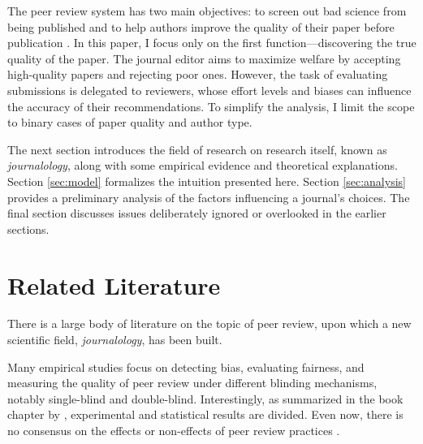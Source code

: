 \documentclass[12pt]{article}
\begin{document}
The peer review system has two main objectives: to screen out bad science from
being published and to help authors improve the quality of their paper before
publication \citep{tan2018peer}. In this paper, I focus only on the first
function—discovering the true quality of the paper. The journal editor aims to
maximize welfare by accepting high-quality papers and rejecting poor ones.
However, the task of evaluating submissions is delegated to reviewers, whose
effort levels and biases can influence the accuracy of their recommendations.
To simplify the analysis, I limit the scope to binary cases of paper quality
and author type.

The next section introduces the field of research on research itself, known as
\textit{journalology}, along with some empirical evidence and theoretical
explanations. Section \ref{sec:model} formalizes the intuition presented here.
Section \ref{sec:analysis} provides a preliminary analysis of the factors
influencing a journal's choices. The final section discusses issues
deliberately ignored or overlooked in the earlier sections.

\section{Related Literature}
There is a large body of literature on the topic of peer review, upon which a
new scientific field, \textit{journalology}, has been built.

Many empirical studies focus on detecting bias, evaluating fairness, and
measuring the quality of peer review under different blinding mechanisms,
notably single-blind and double-blind. Interestingly, as summarized in the book
chapter by \citet{largent2016blind}, experimental and statistical results are
divided. Even now, there is no consensus on the effects or non-effects of peer
review practices \cite{blank1991effects,tomkins2017reviewer}.
\end{document}
